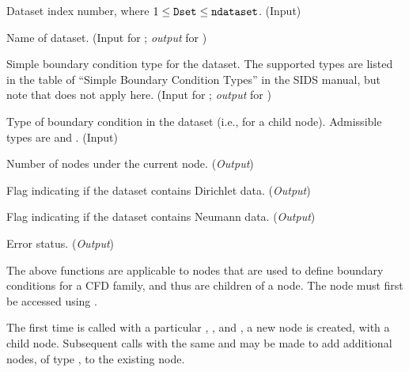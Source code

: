 \begin{Ventryi}{}\raggedright
\item [\fort{Dset}]
      Dataset index number, where $1 \leq \text{{\normalfont\texttt{Dset}}} \leq \text{{\normalfont\texttt{ndataset}}}$.
      (\textcolor{input}{Input})
\item [\fort{DatasetName}]
      Name of dataset.
      (\textcolor{input}{Input} for ;
      \textcolor{output}{\textit{output}} for )
\item [\fort{BCType}]
      Simple boundary condition type for the dataset.
      The supported types are listed in the table of ``Simple
      Boundary Condition Types'' in the SIDS manual, but note that
       does not apply here.
      (\textcolor{input}{Input} for ;
      \textcolor{output}{\textit{output}} for )
\item [\fort{BCDataType}]
      Type of boundary condition in the dataset (i.e., for a
       child node).
      Admissible types are  and .
      (\textcolor{input}{Input})
\item [\fort{ndataset}]
      Number of  nodes under the current
       node.
      (\textcolor{output}{\textit{Output}})
\item [\fort{DirichletFlag}]
      Flag indicating if the dataset contains Dirichlet data.
      (\textcolor{output}{\textit{Output}})
\item [\fort{NeumannFlag}]
      Flag indicating if the dataset contains Neumann data.
      (\textcolor{output}{\textit{Output}})
\item [\fort{ier}]
      Error status.
      (\textcolor{output}{\textit{Output}})
\end{Ventryi}

The above functions are applicable to  nodes
that are used to define boundary conditions for a CFD family, and thus
are children of a  node.
The  node must first be accessed using .

The first time  is called with a particular
, , and , a new
 node is created, with a child  node.
Subsequent calls with the same  and 
may be made to add additional  nodes, of type
, to the existing  node.

